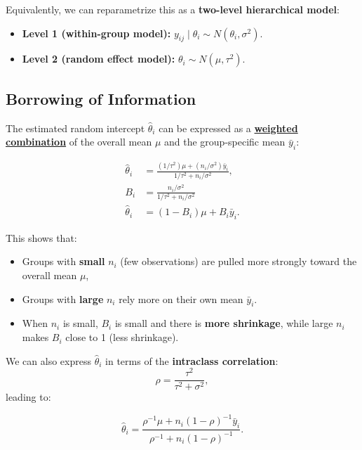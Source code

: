 \documentclass[
  letterpaper,
  DIV=11,
  numbers=noendperiod]{scrreprt}
\providecommand{\tightlist}{%
  \setlength{\itemsep}{0pt}\setlength{\parskip}{0pt}}\usepackage{longtable,booktabs,array}
\begin{document}
Equivalently, we can reparametrize this as a \textbf{two-level
hierarchical model}:

\begin{itemize}
\tightlist
\item
  \textbf{Level 1 (within-group model):}
  \(y_{ij} \mid \theta_i \sim N( \theta_i, \sigma^2)\).
\item
  \textbf{Level 2 (random effect model):}
  \(\theta_i \sim N(\mu, \tau^2)\).
\end{itemize}

\hypertarget{borrowing-of-information}{%
\subsection*{Borrowing of Information}\label{borrowing-of-information}}

The estimated random intercept \(\hat{\theta}_i\) can be expressed as a
\ul{\textbf{weighted combination}} of the overall mean \(\mu\) and the
group-specific mean \(\bar{y}_i\):

\[
\begin{align*}
\hat{\theta}_i & 
= \frac{(1/\tau^2) \mu + (n_i / \sigma^2) \bar{y}_i}{1/\tau^2 + n_i / \sigma^2},\\
B_i & = \frac{n_i/\sigma^2}{1/\tau^2 + n_i/\sigma^2}\\
\hat{\theta}_i & = (1-B_i) \mu + B_i \bar{y}_i.
\end{align*}
\]

This shows that:

\begin{itemize}
\tightlist
\item
  Groups with \textbf{small} \(n_i\) (few observations) are pulled more
  strongly toward the overall mean \(\mu\),
\item
  Groups with \textbf{large} \(n_i\) rely more on their own mean
  \(\bar{y}_i\).
\item
  When \(n_i\) is small, \(B_i\) is small and there is \textbf{more
  shrinkage}, while large \(n_i\) makes \(B_i\) close to 1 (less
  shrinkage).
\end{itemize}

We can also express \(\hat{\theta}_i\) in terms of the
\textbf{intraclass correlation}: \[
\rho = \frac{\tau^2}{\tau^2 + \sigma^2},
\] leading to:

\[
\hat{\theta}_i 
= \frac{\rho^{-1} \mu + n_i (1-\rho)^{-1} \bar{y}_i}{\rho^{-1} + n_i (1-\rho)^{-1}}.
\]
\end{document}
